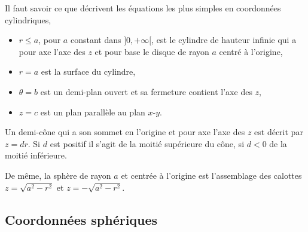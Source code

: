 \begin{example}
Il faut savoir ce que décrivent les équations les plus simples en coordonnées cylindriques, 
\begin{itemize}
\item $r\leq a$, pour $a$ constant dans  $]0, +\infty[$, est le cylindre de hauteur infinie qui a pour axe l'axe des $z$ et pour base le disque de rayon $a$ centré à l'origine, 
\item $r= a$ est  la surface du cylindre,
\item $\theta = b$ est un demi-plan ouvert et sa fermeture contient l'axe des $z$,
\item $z=c$ est un plan parallèle au plan $x$-$y$. 
\end{itemize}
\end{example}

\begin{example}
  Un demi-cône qui a  son sommet en l'origine et  pour axe l'axe des $z$ est décrit par $z=d r$.  Si $d$ est positif  il s'agit  de la moitié supérieure du cône, si $d<0$ de la moitié inférieure.
\end{example}

\begin{example}
 De même,  la sphère de rayon $a$ et centrée à l'origine est l'assemblage des calottes $z=\sqrt{a^2-r^2}$ et $z=-\sqrt{a^2-r^2}$. 
\end{example}

\subsection{Coordonnées sphériques}

